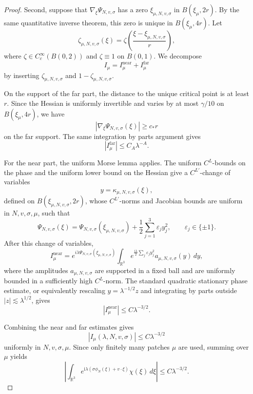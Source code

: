 \documentclass[10pt]{amsart}
\numberwithin{equation}{section}
\theoremstyle{plain}
\theoremstyle{definition}
\theoremstyle{remark}
\newcommand{\ii}{\mathrm{i}}
\begin{document}
\begin{proof}
Second, suppose that \(\nabla_\xi\Psi_{N,v,\sigma}\) has a zero
\(\xi_{\mu,N,v,\sigma}\) in \(B(\xi_\mu,2r)\). By the same quantitative
inverse theorem, this zero is unique in \(B(\xi_\mu,4r)\). Let
\[
      \zeta_{\mu,N,v,\sigma}(\xi)
      =
      \zeta\!\left(\frac{\xi-\xi_{\mu,N,v,\sigma}}{r}\right),
\]
where \(\zeta\in C_c^\infty(B(0,2))\) and \(\zeta\equiv1\) on \(B(0,1)\).
We decompose
\[
       I_\mu=I_{\mu}^{\mathrm{near}}+I_{\mu}^{\mathrm{far}}
\]
by inserting \(\zeta_{\mu,N,v,\sigma}\) and
\(1-\zeta_{\mu,N,v,\sigma}\).

On the support of the far part, the distance to the unique critical point
is at least \(r\). Since the Hessian is uniformly invertible and varies
by at most \(\gamma/10\) on \(B(\xi_\mu,4r)\), we have
\[
       |\nabla_\xi\Psi_{N,v,\sigma}(\xi)|\ge c_* r
\]
on the far support. The same integration by parts argument gives
\[
       |I_{\mu}^{\mathrm{far}}|\le C_A\lambda^{-A}.
\]

For the near part, the uniform Morse lemma applies. The uniform
\(C^L\)-bounds on the phase and the uniform lower bound on the Hessian
give a \(C^{L'}\)-change of variables
\[
       y=\kappa_{\mu,N,v,\sigma}(\xi),
\]
defined on \(B(\xi_{\mu,N,v,\sigma},2r)\), whose \(C^{L'}\)-norms and
Jacobian bounds are uniform in \(N,v,\sigma,\mu\), such that
\[
       \Psi_{N,v,\sigma}(\xi)
       =
       \Psi_{N,v,\sigma}(\xi_{\mu,N,v,\sigma})
       +
       \frac12\sum_{j=1}^3 \varepsilon_j y_j^2,
       \qquad
       \varepsilon_j\in\{\pm1\}.
\]
After this change of variables,
\[
       I_{\mu}^{\mathrm{near}}
       =
       e^{i\lambda\Psi_{N,v,\sigma}(\xi_{\mu,N,v,\sigma})}
       \int_{\mathbb R^3}
          e^{\frac{i\lambda}{2}\sum_j\varepsilon_j y_j^2}
          a_{\mu,N,v,\sigma}(y)\,dy,
\]
where the amplitudes \(a_{\mu,N,v,\sigma}\) are supported in a fixed ball
and are uniformly bounded in a sufficiently high \(C^L\)-norm. The
standard quadratic stationary phase estimate, or equivalently rescaling
\(y=\lambda^{-1/2}z\) and integrating by parts outside \(|z|\lesssim
\lambda^{1/2}\), gives
\[
       |I_{\mu}^{\mathrm{near}}|\le C\lambda^{-3/2}.
\]

Combining the near and far estimates gives
\[
       |I_\mu(\lambda,N,v,\sigma)|\le C\lambda^{-3/2}
\]
uniformly in \(N,v,\sigma,\mu\). Since only finitely many patches
\(\mu\) are used, summing over \(\mu\) yields
\[
   \left|
   \int_{\mathbb R^3}
        e^{\ii\lambda(\sigma\phi_N(\xi)+v\cdot\xi)}
        \chi(\xi)\,d\xi
   \right|
   \le C\lambda^{-3/2}.
\]

\end{proof}
\end{document}
